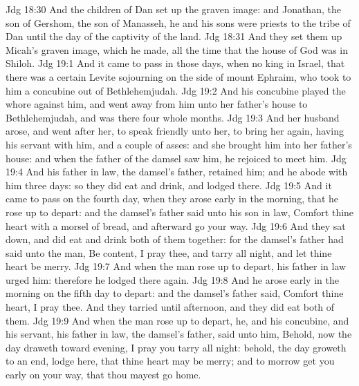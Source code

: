 \vs Jdg 18:30 And the children of Dan set up the graven image: and Jonathan, the son of Gershom, the son of Manasseh, he and his sons were priests to the tribe of Dan until the day of the captivity of the land.
\vs Jdg 18:31 And they set them up Micah's graven image, which he made, all the time that the house of God was in Shiloh.
\vs Jdg 19:1 And it came to pass in those days, when  no king in Israel, that there was a certain Levite sojourning on the side of mount Ephraim, who took to him a concubine out of Bethlehemjudah.
\vs Jdg 19:2 And his concubine played the whore against him, and went away from him unto her father's house to Bethlehemjudah, and was there four whole months.
\vs Jdg 19:3 And her husband arose, and went after her, to speak friendly unto her,  to bring her again, having his servant with him, and a couple of asses: and she brought him into her father's house: and when the father of the damsel saw him, he rejoiced to meet him.
\vs Jdg 19:4 And his father in law, the damsel's father, retained him; and he abode with him three days: so they did eat and drink, and lodged there.
\vs Jdg 19:5 And it came to pass on the fourth day, when they arose early in the morning, that he rose up to depart: and the damsel's father said unto his son in law, Comfort thine heart with a morsel of bread, and afterward go your way.
\vs Jdg 19:6 And they sat down, and did eat and drink both of them together: for the damsel's father had said unto the man, Be content, I pray thee, and tarry all night, and let thine heart be merry.
\vs Jdg 19:7 And when the man rose up to depart, his father in law urged him: therefore he lodged there again.
\vs Jdg 19:8 And he arose early in the morning on the fifth day to depart: and the damsel's father said, Comfort thine heart, I pray thee. And they tarried until afternoon, and they did eat both of them.
\vs Jdg 19:9 And when the man rose up to depart, he, and his concubine, and his servant, his father in law, the damsel's father, said unto him, Behold, now the day draweth toward evening, I pray you tarry all night: behold, the day groweth to an end, lodge here, that thine heart may be merry; and to morrow get you early on your way, that thou mayest go home.
